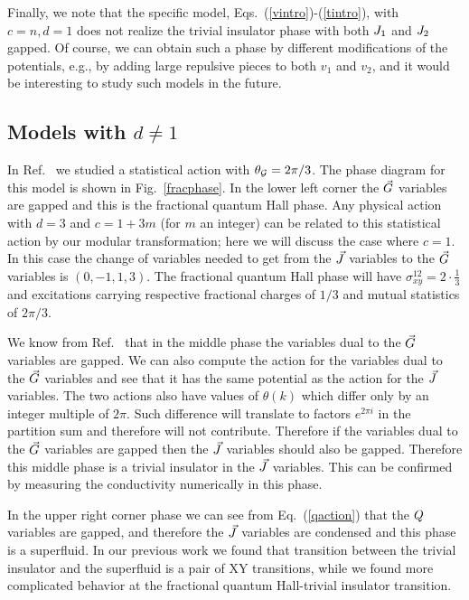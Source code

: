 Finally, we note that the specific model, Eqs.~(\ref{vintro})-(\ref{tintro}), with $c=n, d=1$ does not realize the trivial insulator phase with both $J_1$ and $J_2$ gapped.  Of course, we can obtain such a phase by different modifications of the potentials, e.g., by adding large repulsive pieces to both $v_1$ and $v_2$, and it would be interesting to study such models in the future.


\subsection{Models with $d\neq 1$}
In Ref.~\cite{short_range3} we studied a statistical action with $\theta_{\cal{G}} = 2\pi/3$. The phase diagram for this model is shown in Fig.~\ref{fracphase}. In the lower left corner the $\vec{G}$ variables are gapped and this is the fractional quantum Hall phase. Any physical action with $d=3$ and $c=1+3m$ (for $m$ an integer) can be related to this statistical action by our modular transformation; here we will discuss the case where $c=1$. In this case the change of variables needed to get from the $\vec{J}$ variables to the $\vec{G}$ variables is $(0, -1, 1, 3)$. The fractional quantum Hall phase will have $\sigma^{12}_{xy}=2\cdot\frac{1}{3}$ and excitations carrying respective fractional charges of $1/3$ and mutual statistics of $2\pi/3$.

We know from Ref.~\cite{short_range3} that in the middle phase the variables dual to the $\vec{G}$ variables are gapped. 
We can also compute the action for the variables dual to the $\vec{G}$ variables and see that it has the same potential as the action for the $\vec{J}$ variables. The two actions also have values of $\theta(k)$ which differ only by an integer multiple of $2\pi$. Such difference will translate to factors $e^{2\pi i}$ in the partition sum and therefore will not contribute. Therefore if the variables dual to the $\vec{G}$ variables are gapped then the $\vec{J}$ variables should also be gapped. Therefore this middle phase is a trivial insulator in the $\vec{J}$ variables. This can be confirmed by measuring the conductivity numerically in this phase. 

In the upper right corner phase we can see from Eq.~(\ref{qaction}) that the $Q$ variables are gapped,  and therefore the $\vec{J}$ variables are condensed and this phase is a superfluid.  In our previous work\cite{short_range3} we found that transition between the trivial insulator and the superfluid is a pair of XY transitions, while we found more complicated behavior at the fractional quantum Hall-trivial insulator transition. 

